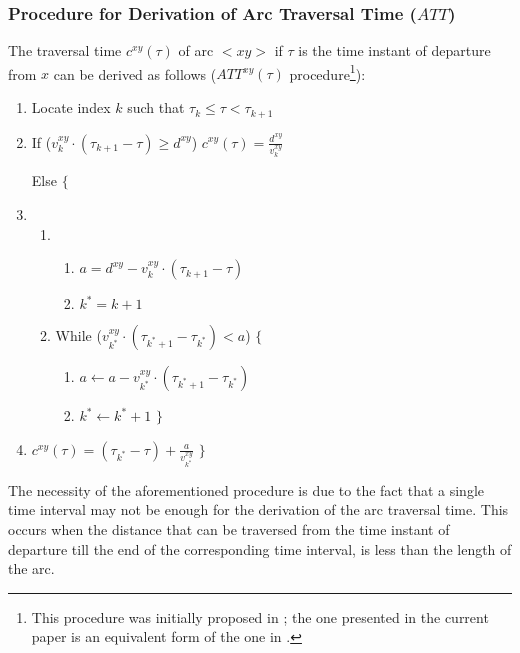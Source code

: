 \documentclass[conference]{IEEEtran}
\begin{document}
\subsubsection{Procedure for Derivation of Arc Traversal Time ($ATT$)} \label{Derivation}
The traversal time $c^{xy}(\tau)$ of arc $<xy>$ if $\tau$ is the time instant of departure from $x$ can be derived as follows ($ATT^{xy}(\tau)$ procedure\footnote{This procedure was initially proposed in \cite{Sung}; the one presented in the current paper is an equivalent form of the one in \cite{Sung}.}):

\begin{enumerate}
    \item Locate index $k$ such that $\tau_k \leq \tau < \tau_{k+1}$ \label{attindex}
    \item If ($v_k^{xy}\cdot(\tau_{k+1}-\tau)\geq d^{xy}$) $c^{xy}(\tau)=\frac{d^{xy}}{v_k^{xy}}$

    Else $\{$
    \item
    \begin{enumerate}
        \item 
        \begin{enumerate}
            \item $a=d^{xy}-v_{k}^{xy}\cdot(\tau_{{k}+1}-\tau)$
            \item $k^*=k+1$
        \end{enumerate}
        \item While ($v_{k^*}^{xy}\cdot(\tau_{k^*+1}-\tau_{k^*})<a$) $\{$  \label{attwhile}
        \begin{enumerate}
            \item $a\leftarrow a-v_{k^*}^{xy}\cdot(\tau_{{k^*}+1}-\tau_{k^*})$
            \item ${k^*}\leftarrow {k^*}+1$ $\}$ \label{stepk}
        \end{enumerate}
    \end{enumerate}
    \item $c^{xy}(\tau)=(\tau_{{k^*}}-\tau)+\frac{a}{v_{k^*}^{xy}}$  $\}$
\end{enumerate}

The necessity of the aforementioned procedure is due to the fact that a single time interval may not  be enough for the derivation of the arc traversal time. This occurs when the distance that can be traversed from the time instant of departure till the end of the corresponding time interval, is less than the length of the arc.
\end{document}
